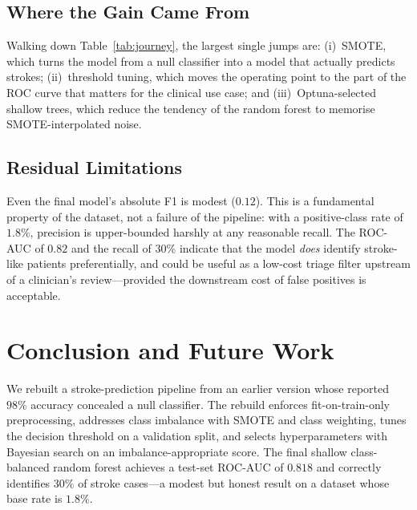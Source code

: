 \documentclass[pdflatex,sn-basic,Numbered]{sn-jnl}
\theoremstyle{thmstyleone}
\theoremstyle{thmstyletwo}
\theoremstyle{thmstylethree}
\begin{document}
\subsection{Where the Gain Came From}
Walking down Table~\ref{tab:journey}, the largest single jumps are:
(i)~SMOTE, which turns the model from a null classifier into a model that
actually predicts strokes; (ii)~threshold tuning, which moves the operating
point to the part of the ROC curve that matters for the clinical use
case; and (iii)~Optuna-selected shallow trees, which reduce the tendency of
the random forest to memorise SMOTE-interpolated noise.

\subsection{Residual Limitations}
Even the final model's absolute F1 is modest ($0.12$). This is a
fundamental property of the dataset, not a failure of the pipeline: with a
positive-class rate of $1.8\%$, precision is upper-bounded harshly at any
reasonable recall. The ROC-AUC of $0.82$ and the recall of $30\%$ indicate
that the model \emph{does} identify stroke-like patients preferentially,
and could be useful as a low-cost triage filter upstream of a clinician's
review---provided the downstream cost of false positives is acceptable.

\section{Conclusion and Future Work}\label{sec:conclusion}

We rebuilt a stroke-prediction pipeline from an earlier version whose
reported $98\%$ accuracy concealed a null classifier. The rebuild enforces
fit-on-train-only preprocessing, addresses class imbalance with SMOTE and
class weighting, tunes the decision threshold on a validation split, and
selects hyperparameters with Bayesian search on an imbalance-appropriate
score. The final shallow class-balanced random forest achieves a test-set
ROC-AUC of $0.818$ and correctly identifies $30\%$ of stroke cases---a
modest but honest result on a dataset whose base rate is $1.8\%$.
\end{document}
